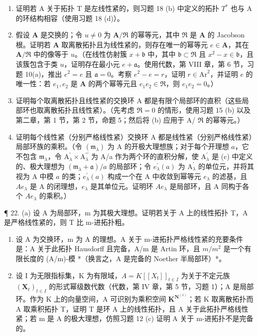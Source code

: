 \begin{enumerate}
\def\labelenumi{(\alph{enumi})}
\item
  证明若 A 关于拓扑 T 是左线性紧的，则习题 18 (b) 中定义的拓扑 \(T^{*}\) 也与 A 的环结构相容（使用习题 18 (d)）。
\item
  假设 \(\mathbf{A}\) 是交换的；令 \(u \neq 0\) 为 \(\mathbf{A} / \Re\) 的幂等元，其中 \(\Re\) 是 \(\mathbf{A}\) 的 Jacobson 根。证明若 \(\mathbf{A}\) 取离散拓扑且为线性紧的，则存在唯一的幂等元 \(e \in \mathbf{A}\)，其在 \(\mathbf{A} / \Re\) 中的像等于 \(u\)。（在线性仿射簇 \(x + \mathfrak{b}\) 中，其中 \(\mathfrak{b} \subset \Re\) 且 \(x^2 - x \in \mathfrak{b}\)，且该簇包含于类 \(u\)，证明存在最小元 \(e + \mathfrak{a}\)。使用代数，第 VIII 章，第 6 节，习题 10(a)，推出 \(e^2 = e\) 且 \(\mathfrak{a} = 0\)。考察 \(e^2 - e = r\)，证明 \(r \in \mathrm{Ar}^2\)，并证明 \(e\) 的唯一性：若 \(e_1, e_2\) 是 \(\mathbf{A}\) 的两个幂等元且 \(e_1 e_2 \in \Re\)，则 \(e_1 e_2 = 0\)。）
\item
  证明每个取离散拓扑且线性紧的交换环 A 都是有限个局部环的直积（这些局部环也取离散拓扑且线性紧）。（先考虑 \(\Re = 0\) 的情形，使用习题 15 (b) 以及第二章，第 1 节，第 2 节，命题 5；然后将 (b) 应用于 A/ \(\Re\) 的幂等元。）
\item
  证明每个线性紧（分别严格线性紧）交换环 A 都是线性紧（分别严格线性紧）局部环族的乘积。（令 \((\mathfrak{m}_{\lambda})\) 为 A 的开极大理想族；对于每个开理想 \(a\)，它不包含 \(\mathfrak{m}_{\lambda}\)，令 \(\mathrm{A}_{\lambda}^{\prime} \times \mathrm{A}_{\lambda}^{\prime \prime}\) 为 A/a 作为两个环的直积分解，使 \(\mathrm{A}_{\lambda}^{\prime}\) 是 (c) 中定义的、极大理想为 \((\mathfrak{m}_{\lambda} + \mathfrak{a}) / a\) 的局部环；令 \(e_{\lambda}^{\prime}(a)\) 为 \(\mathrm{A}_{\lambda}^{\prime}\) 的单位元，并将其视为 A 中模 \(a\) 的类；\(e_{\lambda}^{\prime}(a)\) 构成一个在 A 中收敛到幂等元 \(e_{\lambda}\) 的滤基，且 \(Ae_{\lambda}\) 是 A 的闭理想，\(e_{\lambda}\) 是其单位元。证明环 \(Ae_{\lambda}\) 是局部环，且 A 同构于各个 \(Ae_{\lambda}\) 的乘积。）
\end{enumerate}

¶ 22. (a) 设 A 为局部环，m 为其极大理想。证明若关于 A 上的线性拓扑 T，A 是严格线性紧的，则 T 比 m-进拓扑粗。

\begin{enumerate}
\def\labelenumi{(\alph{enumi})}
\setcounter{enumi}{1}
\item
  设 A 为交换环，m 为 A 的理想。A 关于 m-进拓扑严格线性紧的充要条件是：A 关于此拓扑 Hausdorff 且完备，A/m 是 Artin 环，且 \(m/m^{2}\) 是一个有限长度的 (A/m)-模 *（换言之，A 是完备的 Noether 半局部环）*。
\item
  设 I 为无限指标集，K 为有限域，\(A = K[[X_{t}]]_{t \in I}\) 为关于不定元族 \((\mathbf{X}_{t})_{t \in I}\) 的形式幂级数代数（代数，第 IV 章，第 5 节，习题 1）；A 是局部环。作为 K 上的向量空间，A 可识别为乘积空间 \(\mathbf{K}^{\mathbf{N}^{(1)}}\)；若 K 取离散拓扑而 A 取乘积拓扑 T，证明 T 是环 A 上的线性拓扑，且 A 关于此拓扑严格线性紧；若 m 是 A 的极大理想，仿照习题 12 (c) 证明 A 关于 m-进拓扑不是完备的。
\end{enumerate}

